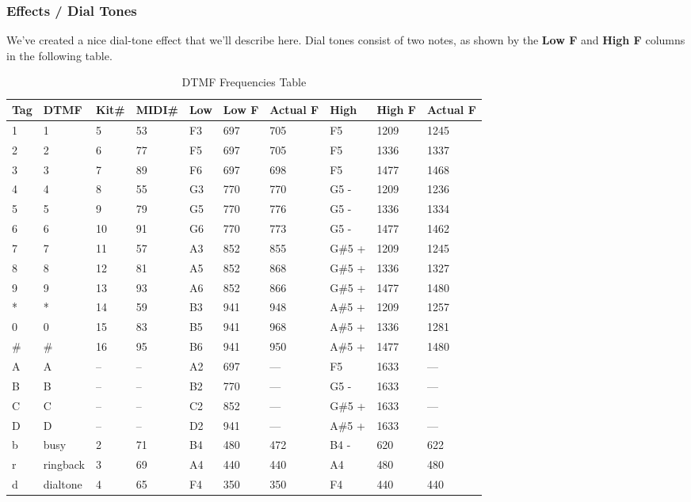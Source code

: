 \subsubsection{Effects / Dial Tones}
\label{subsubsec:cookbook_instruments_effects_dialtones}

   We've created a nice dial-tone effect that we'll describe here.
   Dial tones consist of two notes, as shown by the
   \textbf{Low F} and \textbf{High F} columns in the following table.

\label{table:effect_dial_tones}
\begin{longtable}{l l l l l l l l l l}
   \caption{DTMF Frequencies Table} \\
   \hline
      \textbf{Tag} &
      \textbf{DTMF} &
      \textbf{Kit\#} &
      \textbf{MIDI\#} &
      \textbf{Low} &
      \textbf{Low F} &
      \textbf{Actual F} &
      \textbf{High} &
      \textbf{High F} &
      \textbf{Actual F} \\
   \hline
   \endfirsthead

   1 &  1        & 5  & 53 & F3 &  697 &  705 &  F5     & 1209 &  1245  \\
   2 &  2        & 6  & 77 & F5 &  697 &  705 &  F5     & 1336 &  1337  \\
   3 &  3        & 7  & 89 & F6 &  697 &  698 &  F5     & 1477 &  1468  \\
   4 &  4        & 8  & 55 & G3 &  770 &  770 &  G5 -   & 1209 &  1236  \\
   5 &  5        & 9  & 79 & G5 &  770 &  776 &  G5 -   & 1336 &  1334  \\
   6 &  6        & 10 & 91 & G6 &  770 &  773 &  G5 -   & 1477 &  1462  \\
   7 &  7        & 11 & 57 & A3 &  852 &  855 &  G\#5 + & 1209 &  1245  \\
   8 &  8        & 12 & 81 & A5 &  852 &  868 &  G\#5 + & 1336 &  1327  \\
   9 &  9        & 13 & 93 & A6 &  852 &  866 &  G\#5 + & 1477 &  1480  \\
   * &  *        & 14 & 59 & B3 &  941 &  948 &  A\#5 + & 1209 &  1257  \\
   0 &  0        & 15 & 83 & B5 &  941 &  968 &  A\#5 + & 1336 &  1281  \\
  \# &  \#       & 16 & 95 & B6 &  941 &  950 &  A\#5 + & 1477 &  1480  \\
   A &  A        & -- & -- & A2 &  697 &  --- &  F5     & 1633 &  ---   \\
   B &  B        & -- & -- & B2 &  770 &  --- &  G5 -   & 1633 &  ---   \\
   C &  C        & -- & -- & C2 &  852 &  --- &  G\#5 + & 1633 &  ---   \\
   D &  D        & -- & -- & D2 &  941 &  --- &  A\#5 + & 1633 &  ---   \\
   b &  busy     & 2  & 71 & B4 &  480 &  472 &  B4 -   & 620  &  622   \\
   r &  ringback & 3  & 69 & A4 &  440 &  440 &  A4     & 480  &  480   \\
   d &  dialtone & 4  & 65 & F4 &  350 &  350 &  F4     & 440  &  440   \\
\end{longtable}

